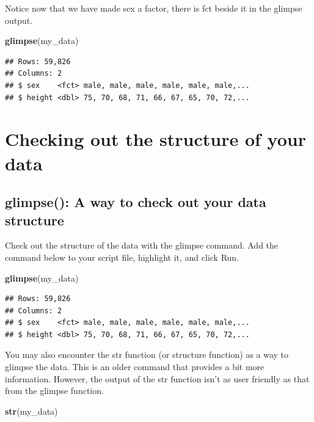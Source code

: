 \documentclass[
]{krantz}
\makeatletter
\newenvironment{Shaded}{\begin{snugshade}}{\end{snugshade}}
\newcommand{\KeywordTok}[1]{\textcolor[rgb]{0.27,0.27,0.27}{\textbf{#1}}}
\newcommand{\NormalTok}[1]{#1}
\newenvironment{kframe}{%
\medskip{}
\setlength{\fboxsep}{.8em}
 \def\at@end@of@kframe{}%
 \ifinner\ifhmode%
  \def\at@end@of@kframe{\end{minipage}}%
  \begin{minipage}{\columnwidth}%
 \fi\fi%
 \def\FrameCommand##1{\hskip\@totalleftmargin \hskip-\fboxsep
 \colorbox{shadecolor}{##1}\hskip-\fboxsep
     \hskip-\linewidth \hskip-\@totalleftmargin \hskip\columnwidth}%
 \MakeFramed {\advance\hsize-\width
   \@totalleftmargin\z@ \linewidth\hsize
   \@setminipage}}%
 {\par\unskip\endMakeFramed%
 \at@end@of@kframe}
\renewenvironment{Shaded}{\begin{kframe}}{\end{kframe}}
\makeatother
\begin{document}
Notice now that we have made sex a factor, there is fct beside it in the glimpse output.

\begin{Shaded}
\begin{Highlighting}[]
\KeywordTok{glimpse}\NormalTok{(my_data)}
\end{Highlighting}
\end{Shaded}

\begin{verbatim}
## Rows: 59,826
## Columns: 2
## $ sex    <fct> male, male, male, male, male, male,...
## $ height <dbl> 75, 70, 68, 71, 66, 67, 65, 70, 72,...
\end{verbatim}

\hypertarget{checking-out-the-structure-of-your-data}{%
\section{Checking out the structure of your data}\label{checking-out-the-structure-of-your-data}}

\hypertarget{glimpse-a-way-to-check-out-your-data-structure}{%
\subsection{glimpse(): A way to check out your data structure}\label{glimpse-a-way-to-check-out-your-data-structure}}

Check out the structure of the data with the glimpse command. Add the command below to your script file, highlight it, and click Run.

\begin{Shaded}
\begin{Highlighting}[]
\KeywordTok{glimpse}\NormalTok{(my_data)}
\end{Highlighting}
\end{Shaded}

\begin{verbatim}
## Rows: 59,826
## Columns: 2
## $ sex    <fct> male, male, male, male, male, male,...
## $ height <dbl> 75, 70, 68, 71, 66, 67, 65, 70, 72,...
\end{verbatim}

You may also encounter the str function (or structure function) as a way to glimpse the data. This is an older command that provides a bit more information. However, the output of the str function isn't as user friendly as that from the glimpse function.

\begin{Shaded}
\begin{Highlighting}[]
\KeywordTok{str}\NormalTok{(my_data)}
\end{Highlighting}
\end{Shaded}
\end{document}
